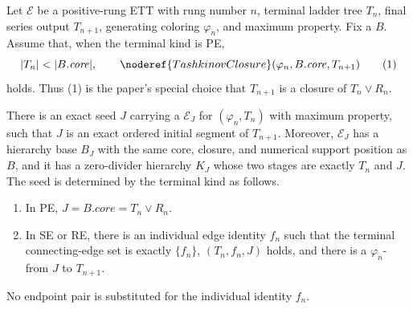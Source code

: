 \begin{lemma}
Let $\mathcal E$ be a positive-rung ETT with rung number $n$, terminal
ladder tree $T_n$, final series output $T_{n+1}$, generating coloring
$\varphi_n$, and maximum property.  Fix a  $B$.
Assume that, when the terminal kind is PE,
\[
 |T_n|<|B.\mathit{core}|,
 \qquad
 \noderef{TashkinovClosure}
   (\varphi_n,B.\mathit{core},T_{n+1})                         \tag{1}
\]
holds.  Thus (1) is the paper's special choice that $T_{n+1}$ is a
closure of $T_n\vee R_n$.

There is an exact seed $J$ carrying a
 $\mathcal E_J$ for
$(\varphi_n,T_n)$ with maximum property, such that $J$ is an exact ordered
initial segment of $T_{n+1}$.  Moreover, $\mathcal E_J$ has a hierarchy
base $B_J$ with the same core, closure, and numerical support position as
$B$, and it has a zero-divider hierarchy $K_J$ whose two stages are exactly
$T_n$ and $J$.  The seed is determined by the terminal kind as follows.
\begin{enumerate}
\item In PE, $J=B.\mathit{core}=T_n\vee R_n$.
\item In SE or RE, there is an individual edge identity $f_n$ such that
  the terminal connecting-edge set is exactly $\{f_n\}$,
  $(T_n,f_n,J)$ holds, and there is a
  $\varphi_n$- from $J$ to
  $T_{n+1}$.
\end{enumerate}
No endpoint pair is substituted for the individual identity $f_n$.
\end{lemma}
